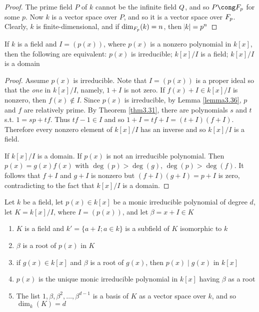 \documentclass[11pt]{article}
\begin{document}
\begin{proof}
The prime field \(P\) of \(k\) cannot be the infinite field \(\relax{Q}\), and so
\(P\cong\F_p\) for some \(p\). Now \(k\) is a  vector space over \(P\), and so it is
a vector space over \(\relax{F}_p\). Clearly, \(k\) is finite-dimensional, and if
\(\dim_{\relax{F}_p}(k)=n\), then \(\abs{k}=p^n\)
\end{proof}

\begin{proposition}[]
\label{prop3.116}
If \(k\) is a field and \(I=(p(x))\), where \(p(x)\) is a nonzero polynomial in
\(k[x]\), then the following are equivalent: \(p(x)\) is irreducible;
\(k[x]/I\) is a field; \(k[x]/I\) is a domain
\end{proposition}

\begin{proof}
Assume \(p(x)\) is irreducible. Note that \(I=(p(x))\) is a proper ideal so
that the \emph{one} in \(k[x]/I\), namely, \(1+I\) is not zero. If 
\(f(x)+I\in k[x]/I\) is nonzero, then \(f(x)\not\in I\). Since \(p(x)\) is
irreducible, by Lemma \ref{lemma3.36}, \(p\) and \(f\) are relatively prime. By 
Theorem \ref{thm3.31}, there are polynomials \(s\) and \(t\) s.t. \(1=sp+tf\).
Thus \(tf-1\in I\) and so \(1+I=tf+I=(t+I)(f+I)\). Therefore every nonzero
element of \(k[x]/I\) has an inverse and so \(k[x]/I\) is a field.

If \(k[x]/I\) is a domain. If \(p(x)\) is not an irreducible polynomial. Then 
\(p(x)=g(x)f(x)\) with \(\deg(p)> \deg(g)\), \(\deg(p)>\deg(f)\). It follows
that \(f+I\) and \(g+I\) is nonzero but \((f+I)(g+I)=p+I\) is zero,
contradicting to the fact that \(k[x]/I\) is a domain.
\end{proof}

\begin{proposition}[]
\label{prop3.117}
\label{nprop2.141}
Let \(k\) be a field, let \(p(x)\in k[x]\) be a monic irreducible polynomial of
degree \(d\), let \(K=k[x]/I\), where \(I=(p(x))\), and let \(\beta=x+I\in K\)
\begin{enumerate}
\item \(K\) is a field and \(k'=\{a+I;a\in k\}\) is a subfield of \(K\) isomorphic
to \(k\)
\item \(\beta\) is a root of \(p(x)\) in \(K\)
\item if \(g(x)\in k[x]\) and \(\beta\) is a root of \(g(x)\), then \(p(x)\mid g(x)\) in 
\(k[x]\)
\item \(p(x)\) is the unique monic irreducible polynomial in \(k[x]\) having \(\beta\) as
a root
\item The list \(1,\beta,\beta^2,\dots,\beta^{d-1}\) is a basis of \(K\) as a vector space
over \(k\), and so \(\dim_k(K)=d\)
\end{enumerate}
\end{proposition}
\end{document}

